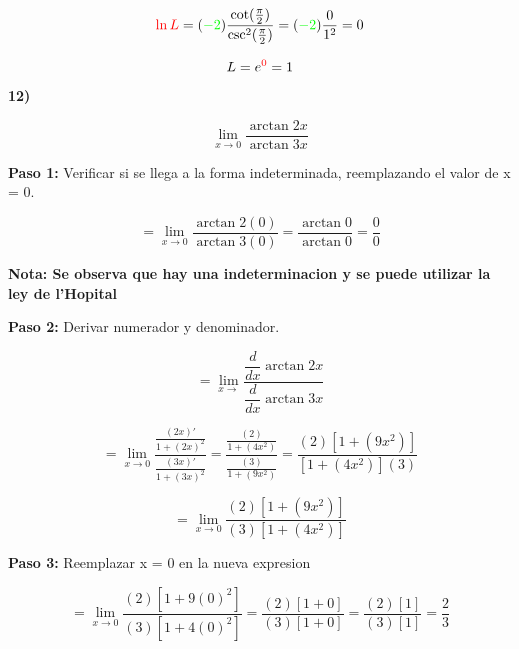 \documentclass[12pt,a4paper]{article}
\begin{document}
\[
\textcolor{red}{\ln L} = (\textcolor{green}{-2})  \frac{\cot (\frac{\pi}{2})}{\csc^2 (\frac{\pi}{2})} =  (\textcolor{green}{-2})\frac{0}{1^2}= 0
\]

\begin{center}
\end{center}


\[
L = e^{\textcolor{red}{0}}= 1
\]

\newpage


\textbf{12)}

\[
\lim_{x \to 0} \frac{\arctan 2x}{\arctan 3x} 
\]

\vspace{0.2cm}

\textbf{Paso 1:}
\vspace{0.2cm}
Verificar si se llega a la forma indeterminada, reemplazando el valor de x = 0.

\[
= \lim_{x \to 0} \frac{\arctan 2(0)}{\arctan 3(0)}= \frac{\arctan 0}{\arctan 0} = \frac{0}{0}
\]


\vspace{0.2cm}

\textbf{Nota: Se observa que hay una indeterminacion y se puede utilizar la ley de l'Hopital }

\vspace{0.5cm}

\textbf{Paso 2:}
\vspace{0.2cm}
Derivar numerador y denominador.

\[
= \lim_{x \to } \frac{\dfrac{d}{dx} \arctan 2x}{\dfrac{d}{dx} \arctan 3x}
\]


\[
= \lim_{x \to 0} \frac{\frac{(2x)'}{1 + (2x)^2}}{\frac{(3x)'}{1 + (3x)^2}}= \frac{\frac{(2)}{1 + (4x^2)}}{\frac{(3)}{1 + (9x^2)}}=\frac{(2)[1 + (9x^2)]}{[1 + (4x^2)](3)} 
\]

\[
= \lim_{x \to 0} \frac{(2)[1 + (9x^2)]}{(3)[1 + (4x^2)]} 
\]
\vspace{0.2cm}



\textbf{Paso 3:}
\vspace{0.2cm}
Reemplazar x = 0 en la nueva expresion

\[
= \lim_{x \to 0} \frac{(2)[1 + 9(0)^2]}{(3)[1 + 4(0)^2]} = \frac{(2)[1 + 0]}{(3)[1 + 0]}= \frac{(2)[1]}{(3)[1]} = \frac{2}{3}
\]
\end{document}
